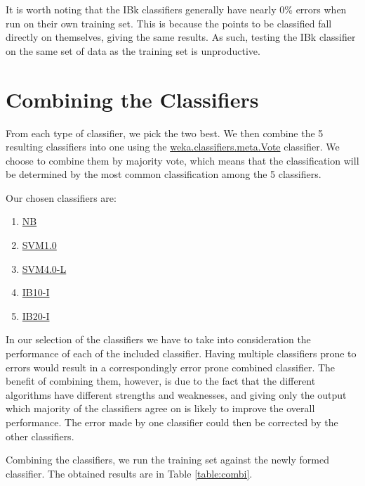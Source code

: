 \documentclass[12pt]{article}
\begin{document}
It is worth noting that the IBk classifiers generally have nearly 0\% errors when run on their own training set. This is because the points to be classified fall directly on themselves, giving the same results. As such, testing the IBk classifier on the same set of data as the training set is unproductive.


\section{Combining the Classifiers}
From each type of classifier, we pick the two best. We then combine the 5 resulting classifiers into one using the \url{weka.classifiers.meta.Vote} classifier. We choose to combine them by majority vote, which means that the classification will be determined by the most common classification among the 5 classifiers.

Our chosen classifiers are:
\begin{enumerate}
	\item \url{NB}
	\item \url{SVM1.0}
	\item \url{SVM4.0-L}
	\item \url{IB10-I}
	\item \url{IB20-I}
\end{enumerate}
In our selection of the classifiers we have to take into consideration the performance of each of the included classifier. Having multiple classifiers prone to errors would result in a correspondingly error prone combined classifier. The benefit of combining them, however, is due to the fact that the different algorithms have different strengths and weaknesses, and giving only the output which majority of the classifiers agree on is likely to improve the overall performance. The error made by one classifier could then be corrected by the other classifiers.

Combining the classifiers, we run the training set against the newly formed classifier. The obtained results are in Table \ref{table:combi}.
\end{document}
